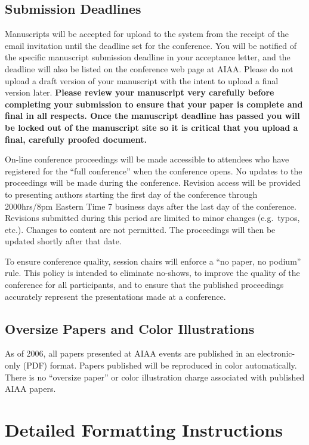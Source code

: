 \subsection{Submission Deadlines}

Manuscripts will be accepted for upload to the system from the receipt of the email invitation until the deadline set for the conference. You will be notified of the specific manuscript submission deadline in your acceptance letter, and the deadline will also be listed on the conference web page at AIAA. Please do not upload a draft version of your manuscript with the intent to upload a final version later. \textbf{Please review your manuscript very carefully before completing your submission to ensure that your paper is complete and final in all respects. Once the manuscript deadline has passed you will be locked out of the manuscript site so it is critical that you upload a final, carefully proofed document.}

On-line conference proceedings will be made accessible to attendees who have registered for the ``full conference'' when the conference opens. No updates to the proceedings will be made during the conference. Revision access will be provided to presenting authors starting the first day of the conference through 2000hrs/8pm Eastern Time 7 business days after the last day of the conference. Revisions submitted during this period are limited to minor changes (e.g.~typos, etc.). Changes to content are not permitted. The proceedings will then be updated shortly after that date.

To ensure conference quality, session chairs will enforce a ``no paper, no podium'' rule. This policy is intended to eliminate no-shows, to improve the quality of the conference for all participants, and to ensure that the published proceedings accurately represent the presentations made at a conference.

\subsection{Oversize Papers and Color Illustrations}
As of 2006, all papers presented at AIAA events are published in an electronic-only (PDF) format. Papers published will be reproduced in color automatically. There is no ``oversize paper'' or color illustration charge associated with published AIAA papers.

\section{Detailed Formatting Instructions}


